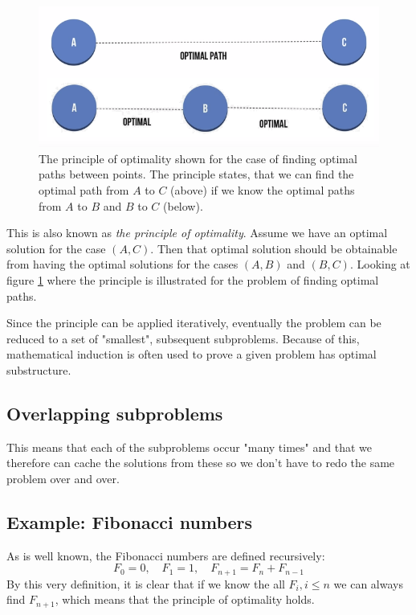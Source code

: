 \documentclass[12pt, a4paper]{article}
\numberwithin{equation}{section}
\begin{document}
\begin{figure}
\centering
\includegraphics[width=\textwidth]{principle_of_optimality}
\caption{The principle of optimality shown for the case of finding optimal paths between points. The principle states, that we can find the optimal path from $A$ to $C$ (above) if we know the optimal paths from $A$ to $B$ and $B$ to $C$ (below).}
\label{fig:principle_of_optimality}
\end{figure}

This is also known as \textit{the principle of optimality}. Assume we have an optimal solution for the case $(A,C)$. Then that optimal solution should be obtainable from having the optimal solutions for the cases $(A,B)$ and $(B,C)$. Looking at figure \ref{fig:principle_of_optimality} where the principle is illustrated for the problem of finding optimal paths.

Since the principle can be applied iteratively, eventually the problem can be reduced to a set of "smallest", subsequent subproblems. Because of this, mathematical induction is often used to prove a given problem has optimal substructure.

\subsection{Overlapping subproblems}
This means that each of the subproblems occur "many times" and that we therefore can cache the solutions from these so we don't have to redo the same problem over and over.

\subsection{Example: Fibonacci numbers}
As is well known, the Fibonacci numbers are defined recursively:
\begin{equation}
F_0=0,\quad F_1=1,\quad F_{n+1}=F_n+F_{n-1} 
\end{equation}
By this very definition, it is clear that if we know the all $F_i, i\le n$ we can always find $F_{n+1}$, which means that the principle of optimality holds.
\end{document}
